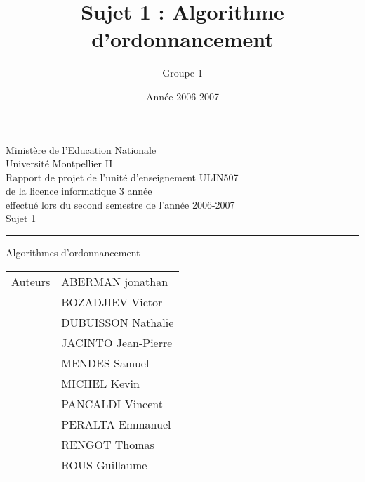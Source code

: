 \documentclass[A4]{report}
\title{Sujet 1 : Algorithme d'ordonnancement}
\author{Groupe 1}
\date{Année 2006-2007}
\theoremstyle{remark}
\newcommand{\sups}[1]{\raisebox{1ex}{\small #1}}
\begin{document}
\begin{titlepage}
\begin{center}
{\large
Ministère de l'Education Nationale \\
\vspace{0.8cm}
Université Montpellier II \\
\vspace{1.5cm}
Rapport de projet de l'unité d'enseignement ULIN507 \\
de la licence informatique 3\sups{ème} année \\
effectué lors du second semestre de l'année 2006-2007 \\
}
\vspace{4cm}
{\huge Sujet 1 }\\
\vspace{0.2cm}
\hrule
\vspace{0.2cm}
{\Huge Algorithmes d'ordonnancement}
\vspace{7cm}
\end{center}
\begin{flushright}
{\raggedleft
\begin{tabular}{r|l}
Auteurs & ABERMAN jonathan \\
& BOZADJIEV Victor \\
& DUBUISSON Nathalie \\
& JACINTO Jean-Pierre \\
& MENDES Samuel \\
& MICHEL Kevin \\
& PANCALDI Vincent \\
& PERALTA Emmanuel \\
& RENGOT Thomas \\
& ROUS Guillaume \\
\end{tabular}
}
\end{flushright}
\end{titlepage}
\tableofcontents






\end{document}
